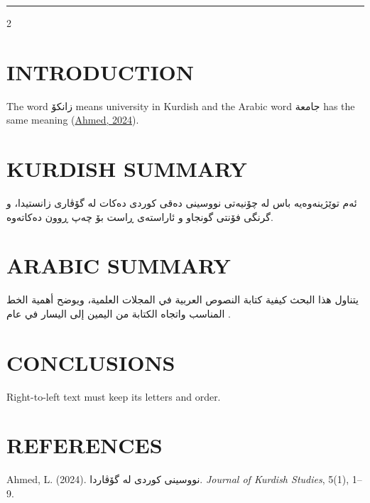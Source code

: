 \documentclass[9pt]{extarticle}
\renewcommand{\normalsize}{\fontsize{9pt}{9pt}\selectfont}
\newcommand{\rtl}[1]{{\arabicfont\beginR #1\endR}}
\newcommand{\ltr}[1]{{\rmfamily\beginL #1\endL}}
\newenvironment{rtlpar}{\par\raggedleft\arabicfont\beginR\ignorespaces}{\unskip\endR\par}
\begin{document}
\normalsize
\noindent \rule{\textwidth}{0.75pt}
\begin{multicols}{2}
\section{INTRODUCTION}
The word \rtl{زانکۆ} means university in Kurdish and the Arabic word \rtl{جامعة} has the same meaning (\hyperlink{ref:1}{Ahmed, 2024}).

\section{KURDISH SUMMARY}
\begin{rtlpar}ئەم توێژینەوەیە باس لە چۆنیەتی نووسینی دەقی کوردی دەکات لە گۆڤاری زانستیدا، و گرنگی فۆنتی گونجاو و ئاراستەی ڕاست بۆ چەپ ڕوون دەکاتەوە.\end{rtlpar}

\section{ARABIC SUMMARY}
\begin{rtlpar}يتناول هذا البحث كيفية كتابة النصوص العربية في المجلات العلمية، ويوضح أهمية الخط المناسب واتجاه الكتابة من اليمين إلى اليسار في عام \ltr{2024}.\end{rtlpar}

\section{CONCLUSIONS}
Right-to-left text must keep its letters and order.

\section*{REFERENCES}
\begin{list}{}{
    \setlength{\leftmargin}{1.5em}
    \setlength{\itemindent}{-1.5em}
    \setlength{\parsep}{0pt}
    \setlength{\itemsep}{6pt}
}
\item \hypertarget{ref:1}{}Ahmed, L. (2024). \rtl{نووسینی کوردی لە گۆڤاردا}. \textit{Journal of Kurdish Studies}, 5(1), 1–9.

\end{list}
\end{multicols}
\end{document}
